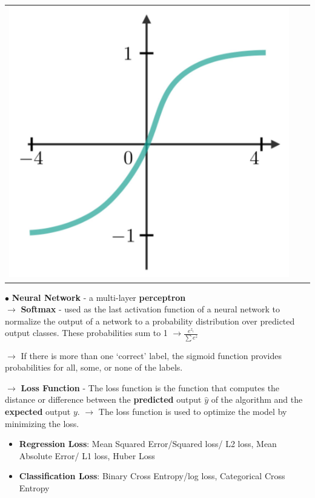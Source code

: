 \documentclass[letterpaper, 10.5pt,landscape]{article}
\begin{document}
\begin{multicols*}{3}
\begin{center}
\begin{tabular}{c|c|c}
         \includegraphics[scale = .047]{figures/tanh.JPG}

\end{tabular}
\end{center}





$\bullet$ \textbf{Neural Network} - a multi-layer \textbf{perceptron} 
\\



$\rightarrow$ \textbf{Softmax} - used as the last activation function of a neural network to normalize the output of a network to a probability distribution over predicted output classes. These probabilities sum to 1 $\to \frac{e^{z_i}}{\sum e^{z}}$

$\rightarrow$ If there is more than one `correct' label, the sigmoid function provides probabilities for all, some, or none of the labels.


\smallskip
$\rightarrow$ \textbf{Loss Function} - The loss function is the
function that computes the distance or difference between the \textbf{predicted} output $\hat{y}$ of the algorithm and the \textbf{expected} output $y$. $\rightarrow$ The loss function is used to optimize the model by minimizing the loss.
\vspace{-5pt}
\begin{itemize}[label={--},leftmargin=4mm]
\vspace{-3pt}
\item \textbf{Regression Loss}: Mean Squared Error/Squared loss/ L2 loss, Mean Absolute Error/ L1 loss, Huber Loss 
\vspace{-3pt}
\item \textbf{Classification Loss}: Binary Cross Entropy/log loss, Categorical Cross Entropy
\vspace{-3pt}
\end{itemize}





\end{multicols*}
\end{document}

